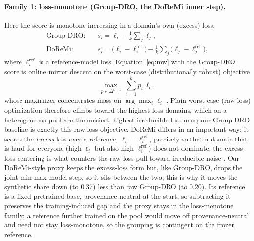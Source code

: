 \documentclass{article}
\begin{document}
\paragraph{Family 1: loss-monotone (Group-DRO, the DoReMi inner step).} Here the score is monotone increasing in a domain's own (excess) loss:
\begin{align}
\text{Group-DRO:}\quad & s_i = \ell_i - \tfrac{1}{k}\textstyle\sum_j \ell_j, \\
\text{DoReMi:}\quad & s_i = \big(\ell_i - \ell_i^{\mathrm{ref}}\big) - \tfrac{1}{k}\textstyle\sum_j \big(\ell_j - \ell_j^{\mathrm{ref}}\big),
\end{align}
where $\ell_i^{\mathrm{ref}}$ is a reference-model loss. Equation~\eqref{eq:mw} with the Group-DRO score is online mirror descent on the worst-case (distributionally robust) objective
\begin{equation}
\max_{p \in \Delta^{k-1}} \; \sum_{i=1}^{k} p_i \, \ell_i ,
\label{eq:dro}
\end{equation}
whose maximizer concentrates mass on $\arg\max_i \ell_i$ \citep{groupdro2020}. Plain worst-case (raw-loss) optimization therefore climbs toward the highest-loss domains, which on a heterogeneous pool are the noisiest, highest-irreducible-loss ones; our Group-DRO baseline is exactly this raw-loss objective. DoReMi differs in an important way: it scores the \emph{excess} loss over a reference, $\ell_i-\ell_i^{\mathrm{ref}}$, precisely so that a domain that is hard for everyone (high $\ell_i$ but also high $\ell_i^{\mathrm{ref}}$) does not dominate; the excess-loss centering is what counters the raw-loss pull toward irreducible noise \citep{doremi2023}. Our DoReMi-style proxy keeps the excess-loss form but, like Group-DRO, drops the joint min-max model step, so it sits between the two; this is why it moves the synthetic share down (to 0.37) less than raw Group-DRO (to 0.20). Its reference is a fixed pretrained base, provenance-neutral at the start, so subtracting it preserves the training-induced gap and the proxy stays in the loss-monotone family; a reference further trained on the pool would move off provenance-neutral and need not stay loss-monotone, so the grouping is contingent on the frozen reference.
\end{document}
